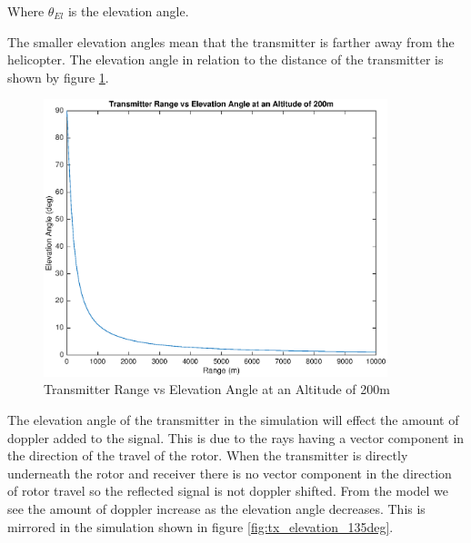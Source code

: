 Where $\theta_{El}$ is the elevation angle. 

The smaller elevation angles mean that the transmitter is farther away from the helicopter. The elevation angle in relation to the distance of the transmitter is shown by figure \ref{fig:tx_range_elevation_rel}.

 \begin{figure}
	\begin{center}
		\includegraphics[width=10cm]{images/simulation/range_elevation_rel.eps}
		\caption{Transmitter Range vs Elevation Angle at an Altitude of 200m}
		\label{fig:tx_range_elevation_rel}
	\end{center}
\end{figure}

The elevation angle of the transmitter in the simulation will effect the amount of doppler added to the signal. This is due to the rays having a vector component in the direction of the travel of the rotor. When the transmitter is directly underneath the rotor and receiver there is no vector component in the direction of rotor travel so the reflected signal is not doppler shifted. From the model we see the amount of doppler increase as the elevation angle decreases. This is mirrored in the simulation shown in figure \ref{fig:tx_elevation_135deg}.

